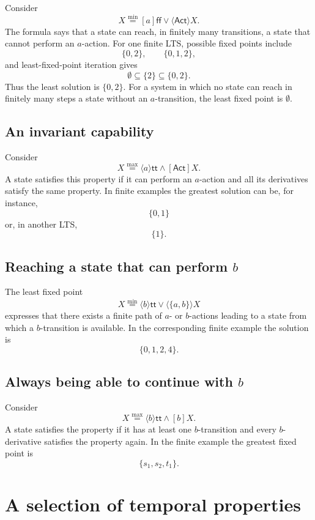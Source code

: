 \documentclass[a4paper]{article}
\newcommand{\Act}{\mathsf{Act}}
\newcommand{\ttt}{\mathsf{tt}}
\newcommand{\fff}{\mathsf{ff}}
\begin{document}
Consider
\[
    X\overset{\min}{=}[a]\fff\lor\langle\Act\rangle X.
\]
The formula says that a state can reach, in finitely many transitions, a state that cannot perform an \(a\)-action.
For one finite LTS, possible fixed points include
\[
    \{0,2\},
    \qquad
    \{0,1,2\},
\]
and least-fixed-point iteration gives
\[
    \emptyset
    \subseteq
    \{2\}
    \subseteq
    \{0,2\}.
\]
Thus the least solution is \(\{0,2\}\).
For a system in which no state can reach in finitely many steps a state without an \(a\)-transition, the least fixed point is \(\emptyset\).

\subsection{An invariant capability}

Consider
\[
    X\overset{\max}{=}\langle a\rangle\ttt\land[\Act]X.
\]
A state satisfies this property if it can perform an \(a\)-action and all its derivatives satisfy the same property.
In finite examples the greatest solution can be, for instance,
\[
    \{0,1\}
\]
or, in another LTS,
\[
    \{1\}.
\]

\subsection{Reaching a state that can perform \(b\)}

The least fixed point
\[
    X\overset{\min}{=}
    \langle b\rangle\ttt
    \lor
    \langle\{a,b\}\rangle X
\]
expresses that there exists a finite path of \(a\)- or \(b\)-actions leading to a state from which a \(b\)-transition is available.
In the corresponding finite example the solution is
\[
    \{0,1,2,4\}.
\]

\subsection{Always being able to continue with \(b\)}

Consider
\[
    X\overset{\max}{=}
    \langle b\rangle\ttt\land[b]X.
\]
A state satisfies the property if it has at least one \(b\)-transition and every \(b\)-derivative satisfies the property again.
In the finite example the greatest fixed point is
\[
    \{s_1,s_2,t_1\}.
\]

\section{A selection of temporal properties}
\end{document}
